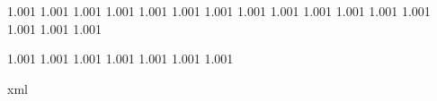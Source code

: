 




\chardef{}
\chardef{}

\newtoks\everywritestring

\def\writedirect  {\immediate\write\statuswrite}
\def\writeline    {\writedirect{}}
\def\writestring#1{\begingroup\the\everywritestring\writedirect{#1}\endgroup}

\ifx\normalmessage    \undefined \let\normalmessage         \message               \fi
\ifx\normalwritestatus\undefined \def\normalwritestatus#1#2{\writedirect{#1 : #2}} \fi


 {1.001}
   {1.001}
 {1.001}
    {1.001}
   {1.001}
  {1.001}
    {1.001}
    {1.001}
     {1.001}
     {1.001}
   {1.001}
    {1.001}
  {1.001}
    {1.001}
    {1.001}
    {1.001}

 {1.001}
 {1.001}
 {1.001}
 {1.001}
 {1.001}
 {1.001}
 {1.001}

\startruntimeluacode
    \edef\asciia{}
    \edef\asciib{xml}
    \ifx\asciia\asciib %
        \long\def\writebanner  #1{\writestring  {<m t='banner'>#1</m>}}
        \long\def\writestatus#1#2{\writestring  {<m t='#1'>#2</m>}}
        \long\def\message      #1{\normalmessage{<m t='message'>#1</m>}}
    \else
        \let\writebanner\writestring
        \let\writestatus\normalwritestatus
        \let\message    \normalmessage
    \fi
\stopruntimeluacode

